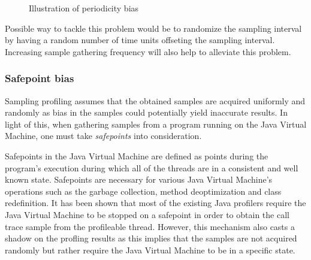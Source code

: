 \documentclass[..thesis.tex]{subfiles}
\begin{document}
\begin{figure}[H]
\centering
{}
\caption{Illustration of periodicity bias}
\label{fig:periodicityBias}
\end{figure}

Possible way to tackle this problem would be to randomize the sampling interval by having a random number of time units offseting the sampling interval. Increasing sample gathering frequency will also help to alleviate this problem.

\subsubsection{Safepoint bias}
Sampling profiling assumes that the obtained samples are acquired uniformly and randomly as bias in the samples could potentially yield inaccurate results. In light of this, when gathering samples from a program running on the Java Virtual Machine, one must take \textit{safepoints} into consideration.

Safepoints in the Java Virtual Machine are defined as points during the program's execution during which all of the threads are in a consistent and well known state. Safepoints are necessary for various Java Virtual Machine's operations such as the garbage collection, method deoptimization and class redefinition.\cite{hotspot_glossary} It has been shown that most of the existing Java profilers require the Java Virtual Machine to be stopped on a safepoint in order to obtain the call trace sample from the profileable thread.\cite{wakart_psychosomatic_2016} However, this mechanism also casts a shadow on the profling results as this implies that the samples are not acquired randomly but rather require the Java Virtual Machine to be in a specific state. \cite{mytkowicz_evaluating_2010}
\end{document}

